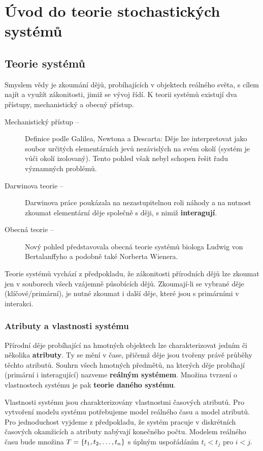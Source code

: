 \chapter{Úvod do teorie stochastických systémů}
\section{Teorie systémů}
Smyslem vědy je zkoumání dějů, probíhajících v objektech reálného světa, s cílem najít a využít zákonitosti, jimiž se vývoj řídí. K teorii systémů existují dva přístupy, mechanistický a obecný přístup.

\begin{description}
\item[Mechanistický přístup --]
Definice podle Galilea, Newtona a Descarta: Děje lze interpretovat jako soubor určitých elementárních jevů nezávislých na svém okolí (systém je vůči okolí izolovaný). Tento pohled však nebyl schopen řešit řadu významných problémů.

\item[Darwinova teorie --] Darwinova práce poukázala na nezastupitelnou roli náhody a na nutnost zkoumat elementární děje společně s ději, s nimiž \textbf{interagují}.

\item[Obecná teorie --] Nový pohled představovala obecná teorie systémů biologa Ludwig von Bertalanffyho a podobně také Norberta Wienera.
\end{description}

Teorie systémů vychází z předpokladu, že zákonitosti přírodních dějů lze zkoumat jen v souborech všech vzájemně působících dějů. Zkoumají-li se vybrané děje (klíčové/primární), je nutné zkoumat i další děje, které jsou s primárními v interakci.

\subsection{Atributy a vlastnosti systému}
Přírodní děje probíhající na hmotných objektech lze charakterizovat jedním či několika \textbf{atributy}. Ty se mění v čase, přičemž děje jsou tvořeny právě průběhy těchto atributů. Souhrn všech hmotných předmětů, na kterých děje probíhají (primární i interagující) nazveme \textbf{reálným systémem}. Množina tvrzení o vlastnostech systému je pak \textbf{teorie daného systému}.

\tab Vlastnosti systému jsou charakterizovány vlastnostmi časových atributů. Pro vytvoření modelu systému potřebujeme model reálného času a model atributů. Pro jednoduchost vyjdeme z předpokladu, že systém pracuje v diskrétních časových okamžicích a atributy nabývají konečného počtu. Modelem reálného času bude množina $T=\brs{\vecrow[t]}$ s úplným uspořádáním $t_i < t_j$ pro $i < j$.

